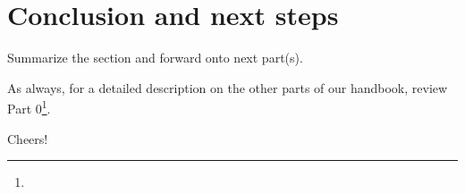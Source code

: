 \genHeader
\section{Conclusion and next steps}
\hypertarget{conclusion}{}

Summarize the section and forward onto next part(s).

As always, for a detailed description on the other parts of our handbook, review Part 0\footnote{\downLink}.

Cheers!